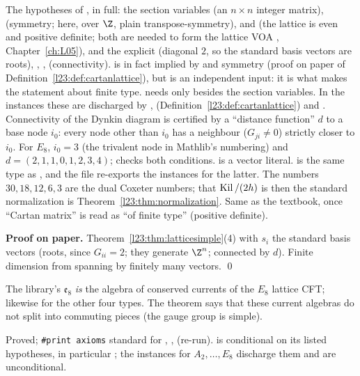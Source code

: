 \begin{dictionary}
The hypotheses of , in full: the section variables  (an $n\times n$ integer matrix),
 (symmetry; here, over $\Z$, plain transpose-symmetry),  and
 (the lattice is even and positive definite; both are needed to form the lattice VOA
, Chapter~\ref{ch:L05}), and the explicit  (diagonal $2$, so the standard basis vectors are roots),
, ,  (connectivity).  is in fact implied by  and symmetry (proof on paper of Definition~\ref{l23:def:cartanlattice}), but
 is an independent input: it is what makes the statement about finite type.  needs only
 besides the section variables. In the instances these are discharged by , 
(Definition~\ref{l23:def:cartanlattice}) and .
Connectivity of the Dynkin diagram is certified by a ``distance function'' $d$ to a base node $i_0$: every node other than $i_0$ has a
neighbour ($G_{ji}\ne0$) strictly closer to $i_0$. For $E_8$, $i_0=3$ (the trivalent node in Mathlib's numbering) and
$d=(2,1,1,0,1,2,3,4)$;  checks both conditions. \lean{![…]} is a vector literal.  is the same type
as , and the file re-exports the instances for the latter. The numbers $30,18,12,6,3$ are the dual Coxeter
numbers; that $\operatorname{Kil}/(2h)$ is then the standard normalization is Theorem~\ref{l23:thm:normalization}. Same as the textbook,
once ``Cartan matrix'' is read as ``of finite type'' (positive definite).
\end{dictionary}

\textbf{Proof on paper.} Theorem~\ref{l23:thm:latticesimple}(4) with $s_i$ the standard basis vectors (roots, since $G_{ii}=2$; they
generate $\Z^n$; connected by $d$). Finite dimension from spanning by finitely many vectors. \qed

\begin{physics}
The library's $\mathfrak e_8$ \emph{is} the algebra of conserved currents of the $E_8$ lattice CFT; likewise for the other four types.
The theorem says that these current algebras do not split into commuting pieces (the gauge group is simple).
\end{physics}

\begin{status}
Proved; \texttt{\#print axioms} standard for , ,
 (re-run).  is conditional on its listed hypotheses, in particular ;
the instances for $A_2,\dots,E_8$ discharge them and are unconditional.
\end{status}

